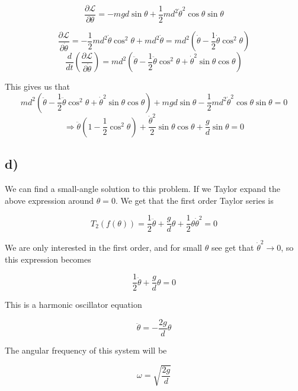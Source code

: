 \documentclass[a4paper,norsk, 10pt]{article}
\begin{document}
$$
\frac{\partial \mathcal{L}}{\partial \theta} = -mgd\sin\theta + \frac{1}{2}md^2\dot{\theta}^2\cos\theta\sin\theta
$$

$$
\frac{\partial \mathcal{L}}{\partial \dot{\theta}} = -\frac{1}{2}md^2\dot{\theta}\cos^2\theta +md^2\dot{\theta} = md^2(\dot{\theta} - \frac{1}{2}\dot{\theta}\cos^2\theta)
$$
$$
\frac{d}{dt}\left(\frac{\partial \mathcal{L}}{\partial \dot{\theta}}\right) = md^2(\ddot{\theta} - \frac{1}{2}\ddot{\theta}\cos^2\theta + \dot{\theta}^2\sin\theta\cos\theta)
$$

This gives us that
$$
md^2(\ddot{\theta} - \frac{1}{2}\ddot{\theta}\cos^2\theta + \dot{\theta}^2\sin\theta\cos\theta) +mgd\sin\theta - \frac{1}{2}md^2\dot{\theta}^2\cos\theta\sin\theta = 0
$$
$$
\Rightarrow \ddot{\theta}(1-\frac{1}{2}\cos^2\theta) + \frac{\dot{\theta}^2}{2}\sin\theta\cos\theta + \frac{g}{d}\sin\theta = 0
$$

\subsection*{d)}
We can find a small-angle solution to this problem. If we Taylor expand the above expression around $\theta = 0$. We get that the first order Taylor series is

$$
T_2(f(\theta)) = \frac{1}{2}\ddot{\theta}+\frac{g}{d}\theta + \frac{1}{2}\theta\dot{\theta}^2 = 0
$$

We are only interested in the first order, and for small $\theta$ see get that $\dot{\theta}^2 \rightarrow 0$, so this expression becomes

$$
\frac{1}{2}\ddot{\theta}+\frac{g}{d}\theta= 0
$$

This is a harmonic oscillator equation

$$
\ddot{\theta} = - \frac{2g}{d}\theta
$$

The angular frequency of this system will be

$$
\omega = \sqrt{\frac{2g}{d}}
$$
\end{document}
